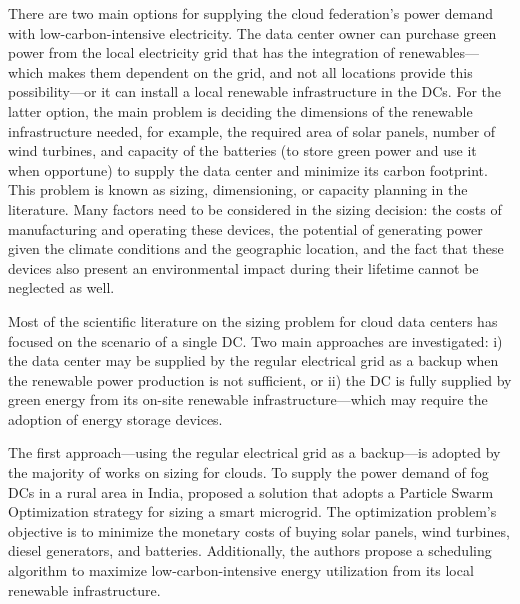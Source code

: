 \label{sec:sizing}


There are two main options for supplying the cloud federation's power demand with low-carbon-intensive electricity. The data center owner can purchase green power from the local electricity grid that has the integration of renewables---which makes them dependent on the grid, and not all locations provide this possibility---or it can install a local renewable infrastructure in the DCs. For the latter option, the main problem is deciding the dimensions of the renewable infrastructure needed, for example, the required area of solar panels, number of wind turbines, and capacity of the batteries  (to store green power and use it when opportune) to supply the data center and minimize its carbon footprint. This problem is known as sizing, dimensioning, or capacity planning in the literature. Many factors need to be considered in the sizing decision: the costs of manufacturing and operating these devices, the potential of generating power given the climate conditions and the geographic location, and the fact that these devices also present an environmental impact during their lifetime cannot be neglected as well.

Most of the scientific literature on the sizing problem for cloud data centers has focused on the scenario of a single DC. Two main approaches are investigated: i) the data center may be supplied by the regular electrical grid as a backup when the renewable power production is not sufficient, or ii) the DC is fully supplied by green energy from its on-site renewable infrastructure---which may require the adoption of energy storage devices.


The first approach---using the regular electrical grid as a backup---is adopted by the majority of works on sizing for clouds. To supply the power demand of fog DCs in a rural area in India, \citet{padma2021_fogdcs_rural} proposed a solution that adopts a Particle Swarm Optimization strategy for sizing a smart microgrid. The optimization problem's objective is to minimize the monetary costs of buying solar panels, wind turbines, diesel generators, and batteries. Additionally, the authors propose a scheduling algorithm to maximize low-carbon-intensive energy utilization from its local renewable infrastructure. %


